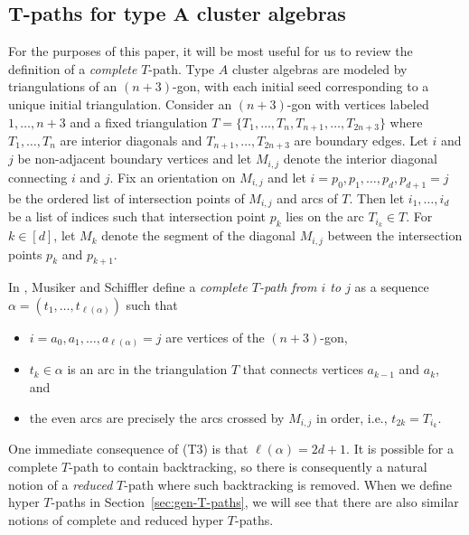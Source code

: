 \documentclass[pdftex]{sigma}
\numberwithin{equation}{section}
\newcommand{\new}[1]{{#1}}
\begin{document}
\subsection[T-paths for type A cluster algebras]{$\boldsymbol{T}$-paths for type $\boldsymbol{A}$ cluster algebras}\label{sec:T-path-bg}
For the purposes of this paper, it will be most useful for us to review the definition of a \emph{complete} $T$-path.
Type $A$ cluster algebras are modeled by triangulations of an $(n+3)$-gon, with each initial seed corresponding to a unique initial triangulation. Consider an $(n+3)$-gon with vertices labeled $1, \dots, n+3$ and a fixed triangulation $T = \{ T_1, \dots, T_n, T_{n+1}, \dots, T_{2n+3} \}$ where $T_1, \dots, T_n$ are interior diagonals and $T_{n+1},\dots, T_{2n+3}$ are boundary edges. Let $i$ and $j$ be non-adjacent boundary vertices and let $M_{i,j}$ denote the interior diagonal connecting $i$ and $j$. Fix an orientation on $M_{i,j}$ and let $i = p_0, p_1, \dots, p_{d}, p_{d+1} = j$ be the ordered list of intersection points of $M_{i,j}$ and arcs of $T$. Then let $i_1, \dots, i_{d}$ be a list of indices such that intersection point $p_k$ lies on the arc $T_{i_k} \in T$.
For $k \in [d]$, let $M_k$ denote the segment of the diagonal $M_{i,j}$ between the intersection points $p_k$ and $p_{k+1}$.

In \cite{MS-09}, Musiker and Schiffler define a \emph{complete $T$-path from $i$ to $j$} as a sequence $\alpha = ( t_1,\dots,t_{\ell(\alpha)})$ such that
\begin{itemize}\itemsep=0pt
 \item[(T1)] $i = a_0,a_1, \dots,a_{\ell(\alpha)} = j$ are vertices of the $(n+3)$-gon,
 \item[(T2)] $t_k \in \alpha$ is an arc in the triangulation $T$ that connects vertices $a_{k-1}$ and $a_k$, and
 \item[(T3)] the even arcs are precisely the arcs crossed by $M_{i,j}$ in order, i.e., $t_{2k} = T_{i_k}$.
\end{itemize}
One immediate consequence of (T3) is that
\new{$\ell(\alpha)=2d+1$}.
It is possible for a complete $T$-path to contain backtracking, so there is consequently a natural notion of a \emph{reduced} $T$-path where such backtracking is removed. When we define hyper $T$-paths in Section~\ref{sec:gen-T-paths}, we will see that there are also similar notions of complete and reduced hyper $T$-paths.
\end{document}
